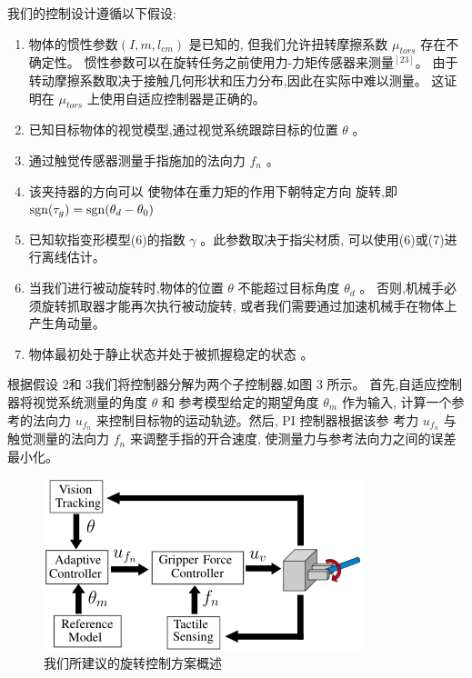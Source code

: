 我们的控制设计遵循以下假设:

\begin{enumerate}
  \item 物体的惯性参数$\left( {I,m,{l_{cm}}} \right)$ 是已知的,
    但我们允许扭转摩擦系数 $\mu_{tors}$ 存在不确定性。
    惯性参数可以在旋转任务之前使用力-力矩传感器来测量$^{[23]}$。
    由于转动摩擦系数取决于接触几何形状和压力分布,因此在实际中难以测量。
    这证明在 $\mu_{tors}$ 上使用自适应控制器是正确的。
  \item 已知目标物体的视觉模型,通过视觉系统跟踪目标的位置 $\theta$ 。
  \item 通过触觉传感器测量手指施加的法向力 $f_n$ 。
  \item 该夹持器的方向可以 使物体在重力矩的作用下朝特定方向 旋转,即
    ${\mathop{\rm sgn}} ({\tau _g}) = {\mathop{\rm sgn}} ({\theta _d} - {\theta _0})$
  \item 已知软指变形模型(6)的指数 $\gamma$ 。此参数取决于指尖材质,
    可以使用(6)或(7)进行离线估计。
  \item 当我们进行被动旋转时,物体的位置 $\theta$ 不能超过目标角度 $\theta_d$ 。
    否则,机械手必须旋转抓取器才能再次执行被动旋转,
    或者我们需要通过加速机械手在物体上产生角动量。
  \item 物体最初处于静止状态并处于被抓握稳定的状态 。
\end{enumerate}


根据假设 2和 3我们将控制器分解为两个子控制器,如图 3 所示。
首先,自适应控制器将视觉系统测量的角度 $\theta$ 和
参考模型给定的期望角度 $\theta_m$ 作为输入,
计算一个参考的法向力 $u_{f_n}$ 来控制目标物的运动轨迹。然后, PI 控制器根据该参
考力 $u_{f_n}$ 与触觉测量的法向力 $f_n$ 来调整手指的开合速度,
使测量力与参考法向力之间的误差最小化。

\begin{figure}[!ht]
  \centering
  \includegraphics[scale=1]{appendices/pic/4-1}
  \caption*{
    我们所建议的旋转控制方案概述}
  \vspace{-0.3cm}
\end{figure}


